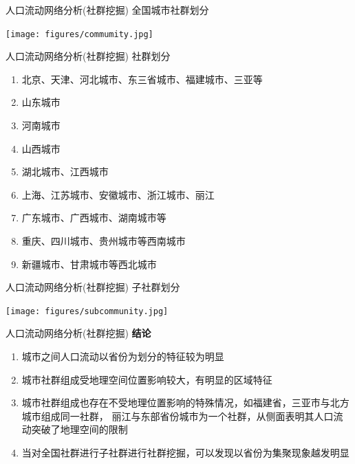 \begin{frame}[t]{人口流动网络分析(社群挖掘)}
    全国城市社群划分

    \texttt{[image: figures/commumity.jpg]}
\end{frame}

\begin{frame}[t]{人口流动网络分析(社群挖掘)}
    \alert{社群划分}

    \begin{enumerate}
        \item 北京、天津、河北城市、东三省城市、福建城市、三亚等
        \item 山东城市
        \item 河南城市
        \item 山西城市
        \item 湖北城市、江西城市
        \item 上海、江苏城市、安徽城市、浙江城市、丽江
        \item 广东城市、广西城市、湖南城市等
        \item 重庆、四川城市、贵州城市等西南城市
        \item 新疆城市、甘肃城市等西北城市
    \end{enumerate}
\end{frame}

\begin{frame}[t]{人口流动网络分析(社群挖掘)}
    \alert{子社群划分}

    \texttt{[image: figures/subcommunity.jpg]}
\end{frame}

\begin{frame}[t]{人口流动网络分析(社群挖掘)}
    \textbf{结论}

    \begin{enumerate}
        \item 城市之间人口流动以省份为划分的特征较为明显
        \item 城市社群组成受地理空间位置影响较大，有明显的区域特征
        \item 城市社群组成也存在不受地理位置影响的特殊情况，如福建省，三亚市与北方城市组成同一社群，
              丽江与东部省份城市为一个社群，从侧面表明其人口流动突破了地理空间的限制
        \item 当对全国社群进行子社群进行社群挖掘，可以发现以省份为集聚现象越发明显
    \end{enumerate}
\end{frame}
